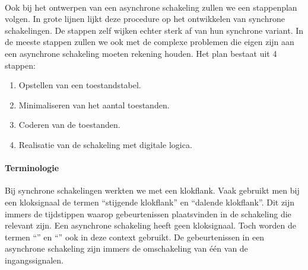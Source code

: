 \paragraph{}
Ook bij het ontwerpen van een asynchrone schakeling zullen we een stappenplan volgen. In grote lijnen lijkt deze procedure op het ontwikkelen van synchrone schakelingen. De stappen zelf wijken echter sterk af van hun synchrone variant. In de meeste stappen zullen we ook met de complexe problemen die eigen zijn aan een asynchrone schakeling moeten rekening houden. Het plan bestaat uit 4 stappen:
\begin{enumerate}
 \item Opstellen van een toestandstabel.
 \item Minimaliseren van het aantal toestanden.
 \item Coderen van de toestanden.
 \item Realisatie van de schakeling met digitale logica.
\end{enumerate}
\paragraph{Terminologie}
Bij synchrone schakelingen werkten we met een klokflank. Vaak gebruikt men bij een kloksignaal de termen ``stijgende klokflank'' en ``dalende klokflank''. Dit zijn immers de tijdstippen waarop gebeurtenissen plaatsvinden in de schakeling die relevant zijn. Een asynchrone schakeling heeft geen kloksignaal. Toch worden de termen ``'' en ``'' ook in deze context gebruikt. De gebeurtenissen in een asynchrone schakeling zijn immers de omschakeling van \'e\'en van de ingangssignalen.
